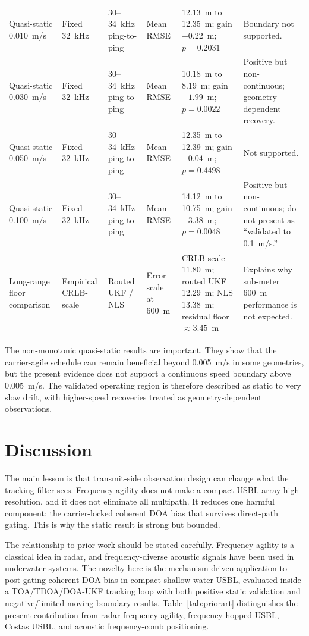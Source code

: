 \documentclass[journal]{IEEEtran}
\begin{document}
\begin{table}[!t]
\begin{tabularx}{\textwidth}{L L L L L L}
Quasi-static 0.010~m/s & Fixed 32~kHz & 30--34~kHz ping-to-ping & Mean RMSE & 12.13~m to 12.35~m;
gain $-0.22$~m; $p=0.2031$ & Boundary not supported. \\
Quasi-static 0.030~m/s & Fixed 32~kHz & 30--34~kHz ping-to-ping & Mean RMSE & 10.18~m to 8.19~m;
gain $+1.99$~m; $p=0.0022$ & Positive but non-continuous; geometry-dependent recovery. \\
Quasi-static 0.050~m/s & Fixed 32~kHz & 30--34~kHz ping-to-ping & Mean RMSE & 12.35~m to 12.39~m;
gain $-0.04$~m; $p=0.4498$ & Not supported. \\
Quasi-static 0.100~m/s & Fixed 32~kHz & 30--34~kHz ping-to-ping & Mean RMSE & 14.12~m to 10.75~m;
gain $+3.38$~m; $p=0.0048$ & Positive but non-continuous; do not present as ``validated to
0.1~m/s.'' \\
Long-range floor comparison & Empirical CRLB-scale & Routed UKF / NLS & Error scale at 600~m &
CRLB-scale 11.80~m; routed UKF 12.29~m; NLS 13.38~m; residual floor $\approx 3.45$~m & Explains why
sub-meter 600~m performance is not expected. \\
\bottomrule
\end{tabularx}
\end{table}

The non-monotonic quasi-static results are important. They show that the carrier-agile schedule
can remain beneficial beyond 0.005~m/s in some geometries, but the present evidence does not
support a continuous speed boundary above 0.005~m/s. The validated operating region is therefore
described as static to very slow drift, with higher-speed recoveries treated as geometry-dependent
observations.

\section{Discussion}
The main lesson is that transmit-side observation design can change what the tracking filter sees.
Frequency agility does not make a compact USBL array high-resolution, and it does not eliminate all
multipath. It reduces one harmful component: the carrier-locked coherent DOA bias that survives
direct-path gating. This is why the static result is strong but bounded.

The relationship to prior work should be stated carefully. Frequency agility is a classical idea in
radar, and frequency-diverse acoustic signals have been used in underwater systems. The novelty
here is the mechanism-driven application to post-gating coherent DOA bias in compact shallow-water
USBL, evaluated inside a TOA/TDOA/DOA-UKF tracking loop with both positive static validation and
negative/limited moving-boundary results. Table~\ref{tab:priorart} distinguishes the present
contribution from radar frequency agility, frequency-hopped USBL, Costas USBL, and acoustic
frequency-comb positioning.
\end{document}
